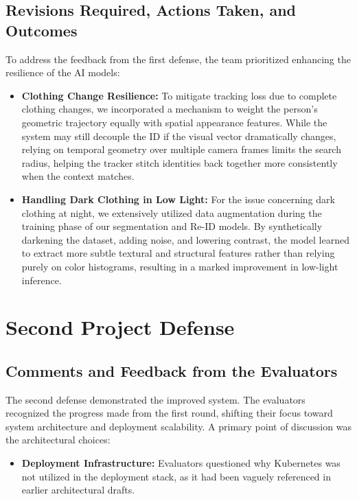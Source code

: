 \subsection{Revisions Required, Actions Taken, and Outcomes}
To address the feedback from the first defense, the team prioritized enhancing the resilience of the AI models:
\begin{itemize}
    \item \textbf{Clothing Change Resilience:} To mitigate tracking loss due to complete clothing changes, we incorporated a mechanism to weight the person's geometric trajectory equally with spatial appearance features. While the system may still decouple the ID if the visual vector dramatically changes, relying on temporal geometry over multiple camera frames limits the search radius, helping the tracker stitch identities back together more consistently when the context matches.
    \item \textbf{Handling Dark Clothing in Low Light:} For the issue concerning dark clothing at night, we extensively utilized data augmentation during the training phase of our segmentation and Re-ID models. By synthetically darkening the dataset, adding noise, and lowering contrast, the model learned to extract more subtle textural and structural features rather than relying purely on color histograms, resulting in a marked improvement in low-light inference.
\end{itemize}

\section{Second Project Defense}

\subsection{Comments and Feedback from the Evaluators}
The second defense demonstrated the improved system. The evaluators recognized the progress made from the first round, shifting their focus toward system architecture and deployment scalability. A primary point of discussion was the architectural choices:
\begin{itemize}
    \item \textbf{Deployment Infrastructure:} Evaluators questioned why Kubernetes was not utilized in the deployment stack, as it had been vaguely referenced in earlier architectural drafts.
\end{itemize}


